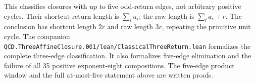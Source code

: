 \documentclass[11pt,letterpaper]{article}
\begin{document}
This classifies closures with up to five odd-return edges, not arbitrary
positive cycles. Their shortcut return length is \(\sum_i a_i\); the
raw length is \(\sum_i a_i+r\). The conclusion has shortcut length \(2r\)
and raw length \(3r\), repeating the primitive unit cycle.
The companion
\nolinkurl{QCD.ThreeAffineClosure.001/lean/ClassicalThreeReturn.lean}
formalizes the complete three-edge classification. It also formalizes
five-edge elimination and the failure of all 35 positive exponent-eight
compositions. The five-edge product window and the full at-most-five
statement above are written proofs.
\end{document}
